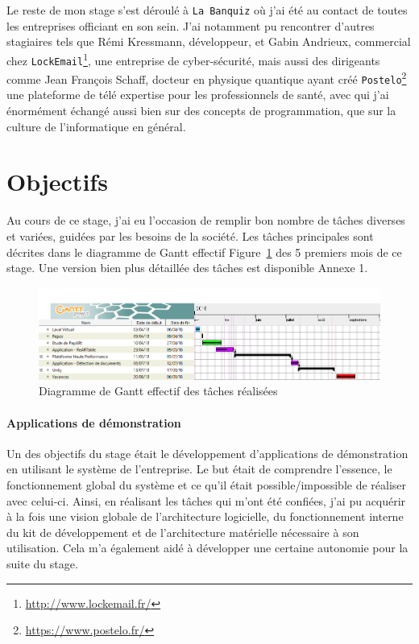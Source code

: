 Le reste de mon stage s'est déroulé à \texttt{La Banquiz} où j'ai été au contact de toutes les entreprises officiant en son sein. J'ai notamment pu rencontrer d'autres stagiaires tels que Rémi Kressmann, développeur, et Gabin Andrieux, commercial chez \texttt{LockEmail}\footnote{\href{http://www.lockemail.fr/}{http://www.lockemail.fr/}}, une entreprise de cyber-sécurité, mais aussi des dirigeants comme Jean François Schaff, docteur en physique quantique ayant créé  \texttt{Postelo}\footnote{\href{https://www.postelo.fr/}{https://www.postelo.fr/}} une plateforme de télé expertise pour les professionnels de santé, avec qui j'ai énormément échangé aussi bien sur des concepts de programmation, que sur la culture de l'informatique en général.

\section{Objectifs}

Au cours de ce stage, j'ai eu l'occasion de remplir bon nombre de tâches diverses et variées, guidées par les besoins de la société. Les tâches principales sont décrites dans le diagramme de Gantt effectif Figure~\ref{fig:gantshort} des 5 premiers mois de ce stage. Une version bien plus détaillée des tâches est disponible Annexe 1.

\begin{figure}[H]
\includegraphics[width=\linewidth]{images/GanttMemoire}
\caption{Diagramme de Gantt effectif des tâches réalisées}
\label{fig:gantshort}
\end{figure}

\paragraph{Applications de démonstration} Un des objectifs du stage était le développement d'applications de démonstration en utilisant le système de l'entreprise. Le but était de comprendre l'essence, le fonctionnement global du système et ce qu'il était possible/impossible de réaliser avec celui-ci. Ainsi, en réalisant les tâches qui m'ont été confiées, j'ai pu acquérir à la fois une vision globale de l'architecture logicielle, du fonctionnement interne du kit de développement et de l'architecture matérielle nécessaire à son utilisation. Cela m'a également aidé à développer une certaine autonomie pour la suite du stage.

